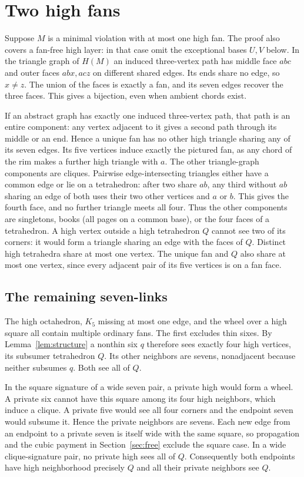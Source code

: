 \documentclass[11pt,a4paper]{amsart}
\begin{document}
\section{Two high fans}\label{sec:fans}
Suppose $M$ is a minimal violation with at most one high fan.
The proof also covers a fan-free high layer: in that case omit
the exceptional bases $U,V$ below. In the triangle graph of
$H(M)$ an induced three-vertex path has middle face $abc$ and
outer faces $abx,acz$ on different shared edges. Its ends share
no edge, so $x\ne z$. The union of the faces is exactly a fan,
and its seven edges recover the three faces. This gives a
bijection, even when ambient chords exist.

If an abstract graph has exactly one induced three-vertex path,
that path is an entire component: any vertex adjacent to it
gives a second path through its middle or an end. Hence a unique
fan has no other high triangle sharing any of its seven edges.
Its five vertices induce exactly the pictured fan, as any chord
of the rim makes a further high triangle with $a$. The other
triangle-graph components are cliques. Pairwise edge-intersecting
triangles either have a common edge or lie on a tetrahedron:
after two share $ab$, any third without $ab$ sharing an edge of
both uses their two other vertices and $a$ or $b$. This gives the
fourth face, and no further triangle meets all four. Thus the
other components are singletons, books (all pages on a common
base), or the four faces of a tetrahedron. A high vertex outside
a high tetrahedron $Q$ cannot see two of its corners: it would
form a triangle sharing an edge with the faces of $Q$. Distinct
high tetrahedra share at most one vertex. The unique fan and $Q$
also share at most one vertex, since every adjacent pair of its
five vertices is on a fan face.

\subsection{The remaining seven-links}
The high octahedron, $K_5$ missing at most one edge, and the wheel
over a high square all contain multiple ordinary fans. The first
excludes thin sixes. By Lemma~\ref{lem:structure} a nonthin six
$q$ therefore sees exactly four high vertices, its subsumer
tetrahedron $Q$. Its other neighbors are sevens, nonadjacent
because neither subsumes $q$. Both see all of $Q$.

In the square signature of a wide seven pair, a private high
would form a wheel. A private six cannot have this square among
its four high neighbors, which induce a clique. A private five
would see all four corners and the endpoint seven would subsume
it. Hence the private neighbors are sevens. Each new edge from
an endpoint to a private seven is itself wide with the same
square, so propagation and the cubic payment in
Section~\ref{sec:free} exclude the square case. In a wide
clique-signature pair, no private high sees all of $Q$.
Consequently both endpoints have high neighborhood precisely $Q$
and all their private neighbors see $Q$.
\end{document}
